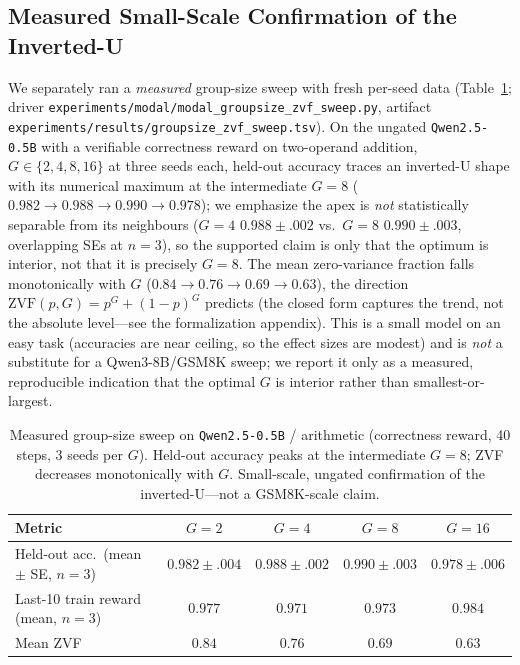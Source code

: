 \subsection{Measured Small-Scale Confirmation of the Inverted-U}
\label{sec:appendix:group-size-measured}

We separately ran a \emph{measured} group-size sweep with fresh per-seed data (Table~\ref{tab:groupsize-measured};
driver \texttt{experiments/modal/modal\_groupsize\_zvf\_sweep.py}, artifact
\texttt{experiments/results/groupsize\_zvf\_sweep.tsv}). On the ungated
\texttt{Qwen2.5-0.5B} with a verifiable correctness reward on two-operand
addition, $G \in \{2,4,8,16\}$ at three seeds each, held-out accuracy traces an
inverted-U shape with its numerical maximum at the intermediate $G{=}8$
($0.982 \to 0.988 \to 0.990 \to 0.978$); we emphasize the apex is \emph{not}
statistically separable from its neighbours ($G{=}4$ $0.988{\pm}.002$ vs.\
$G{=}8$ $0.990{\pm}.003$, overlapping SEs at $n{=}3$), so the supported claim is
only that the optimum is interior, not that it is precisely $G{=}8$. The mean
zero-variance fraction falls monotonically with $G$ ($0.84 \to 0.76 \to 0.69 \to
0.63$), the direction $\mathrm{ZVF}(p,G)=p^{G}+(1-p)^{G}$ predicts (the closed
form captures the trend, not the absolute level---see the formalization
appendix). This is a small model on an easy task (accuracies are near ceiling,
so the effect sizes are modest) and is \emph{not} a substitute for a
Qwen3-8B/GSM8K sweep; we report it only as a measured, reproducible indication
that the optimal $G$ is interior rather than smallest-or-largest.

\begin{table}[ht]
\centering
\small
\begin{tabular}{lcccc}
\toprule
Metric & $G{=}2$ & $G{=}4$ & $G{=}8$ & $G{=}16$ \\
\midrule
Held-out acc.\ (mean $\pm$ SE, $n{=}3$) & $0.982{\pm}.004$ & $0.988{\pm}.002$ & $\mathbf{0.990}{\pm}.003$ & $0.978{\pm}.006$ \\
Last-10 train reward (mean, $n{=}3$) & $0.977$ & $0.971$ & $0.973$ & $0.984$ \\
Mean ZVF & $0.84$ & $0.76$ & $0.69$ & $0.63$ \\
\bottomrule
\end{tabular}
\caption{Measured group-size sweep on \texttt{Qwen2.5-0.5B} / arithmetic
(correctness reward, 40 steps, 3 seeds per $G$). Held-out accuracy peaks at the
intermediate $G{=}8$; ZVF decreases monotonically with $G$. Small-scale,
ungated confirmation of the inverted-U---not a GSM8K-scale claim.}
\label{tab:groupsize-measured}
\end{table}
